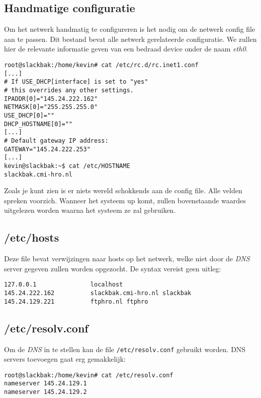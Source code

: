 \subsection{Handmatige configuratie}
Om het netwerk handmatig te configureren is het nodig om de netwerk config file aan te passen. Dit bestand bevat alle netwerk gerelateerde configuratie. We zullen hier de relevante informatie geven van een bedraad device onder de naam \emph{eth0}.
\begin{lstlisting}
root@slackbak:/home/kevin# cat /etc/rc.d/rc.inet1.conf 
[...]
# If USE_DHCP[interface] is set to "yes"
# this overrides any other settings.
IPADDR[0]="145.24.222.162"
NETMASK[0]="255.255.255.0"
USE_DHCP[0]=""
DHCP_HOSTNAME[0]=""
[...]
# Default gateway IP address:
GATEWAY="145.24.222.253"
[...]
kevin@slackbak:~$ cat /etc/HOSTNAME 
slackbak.cmi-hro.nl
\end{lstlisting}%
Zoals je kunt zien is er niets wereld schokkends aan de config file. Alle velden spreken voorzich. Wanneer het systeem up komt, zullen bovenstaande waardes uitgelezen worden waarna het systeem ze zal gebruiken. 

\subsection{/etc/hosts}
Deze file bevat verwijzingen naar hosts op het netwerk, welke niet door de \emph{DNS} server gegeven zullen worden opgezocht. De syntax vereist geen uitleg:
\begin{lstlisting}
127.0.0.1               localhost
145.24.222.162          slackbak.cmi-hro.nl slackbak
145.24.129.221          ftphro.nl ftphro
\end{lstlisting}

\subsection{/etc/resolv.conf}
Om de \emph{DNS} in te stellen kan de file \texttt{/etc/resolv.conf} gebruikt worden. DNS servers toevoegen gaat erg gemakkelijk:
\begin{lstlisting}
root@slackbak:/home/kevin# cat /etc/resolv.conf 
nameserver 145.24.129.1
nameserver 145.24.129.2
\end{lstlisting}

